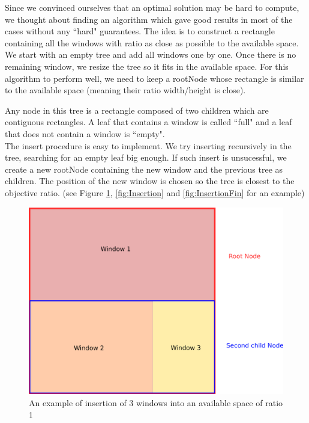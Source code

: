 \documentclass{acmtog}
\begin{document}
Since we convinced ourselves that an optimal solution may be hard to compute, we thought about finding an algorithm which gave good results in most of the cases without any ``hard" guarantees. The idea is to construct a rectangle containing all the windows with ratio as close as possible to the available space. We start with an empty tree and add all windows one by one. Once there is no remaining window, we resize the tree so it fits in the available space. For this algorithm to perform well, we need to keep a rootNode whose rectangle is similar to the available space (meaning their ratio width/height is close). 

Any node in this tree is a rectangle composed of two children which are contiguous rectangles. A leaf that contains a window is called ``full" and a leaf that does not contain a window is ``empty".  \\

The insert procedure is easy to implement. We try inserting recursively in the tree, searching for an empty leaf big enough. If such insert is unsucessful, we create a new rootNode containing the new window and the previous tree as children. The position of the new window is chosen so the tree is closest to the objective ratio. (see Figure \ref{fig:SimpleInsert}, \ref{fig:Insertion} and \ref{fig:InsertionFin} for an example)

\begin{figure}
  \includegraphics[width=\linewidth]{Images/1erDessin.png}
  \caption{An example of insertion of 3 windows into an available space of ratio 1}
  \label{fig:SimpleInsert}
\end{figure}
\end{document}

